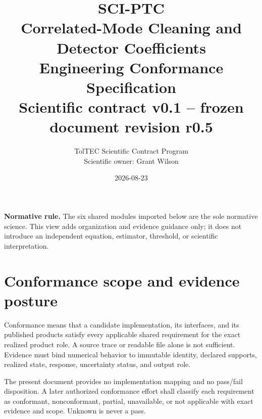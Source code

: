 \documentclass[10pt]{article}
\title{\vspace{-1.0cm}\textcolor{ptcblue}{\Huge SCI-PTC}\\[0.3em]
\Large Correlated-Mode Cleaning and Detector Coefficients\\[0.5em]
\LARGE Engineering Conformance Specification\\[0.4em]
\large Scientific contract v0.1 -- frozen document revision r0.5}
\author{TolTEC Scientific Contract Program\\Scientific owner: Grant Wilson}
\date{2026-08-23}
\begin{document}
\maketitle
\thispagestyle{empty}

\begin{center}
\end{center}

\vfill
\noindent\textbf{Normative rule.} The six shared modules imported below are
the sole normative science. This view adds organization and evidence guidance
only; it does not introduce an independent equation, estimator, threshold, or
scientific interpretation.
\vfill
\clearpage
\tableofcontents
\clearpage

\section{Conformance scope and evidence posture}
\label{sec:engineering-scope}

Conformance means that a candidate implementation, its interfaces, and its
published products satisfy every applicable shared requirement for the exact
realized product role. A source trace or readable file alone is not sufficient.
Evidence must bind numerical behavior to immutable identity, declared
supports, realized state, response, uncertainty status, and output role.

The present document provides no implementation mapping and no pass/fail
disposition. A later authorized conformance effort shall classify each
requirement as conformant, nonconformant, partial, unavailable, or not
applicable with exact evidence and scope. Unknown is never a pass.
\end{document}
